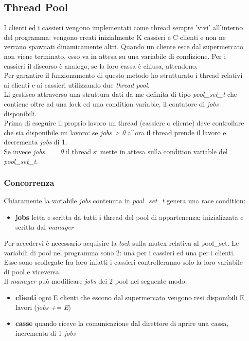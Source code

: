 \documentclass[11pt, a4paper]{article}
\begin{document}
\subsection{Thread Pool}
I clienti ed i cassieri vengono implementati come thread sempre 'vivi' all'interno del programma: vengono creati inizialmente K cassieri e C clienti e non ne verrano spawnati dinamicamente altri. Quando un cliente esce dal supermercato non viene terminato, esso va in attesa su una variabile di condizione. Per i cassieri il discorso è analogo, se la loro cassa è chiusa, attendono.\\
Per garantire il funzionamento di questo metodo ho strutturato i thread relativi ai clienti e ai cassieri utilizzando due \textit{thread pool}. \\Li gestisco attraverso una struttura dati da me definita di tipo \textit{pool\_set\_t} che contiene oltre ad una lock ed una condition variable, il contatore di \textit{jobs} disponibili.\\
Prima di eseguire il proprio lavoro un thread (cassiere o cliente) deve controllare che sia disponibile un lavoro: se \textit{jobs > 0} allora il thread prende il lavoro e decrementa \textit{jobs} di 1. \\ Se invece \textit{jobs == 0} il thread si mette in attesa sulla condition variable del \textit{pool\_set\_t}.
\subsubsection{Concorrenza}
Chiaramente la variabile \textit{jobs} contenuta in \textit{pool\_set\_t} genera una race condition:
\begin{itemize}
\item \textbf{jobs}	letta e scritta da tutti i thread del pool di appartenenza; inizializzata e scritta dal \textit{manager}
\end{itemize} 
Per accedervi è necessario acquisire la \textit{lock} sulla mutex relativa al pool\_set. 
Le variabili di pool nel programma sono 2: una per i cassieri ed una per i clienti. Esse sono scollegate fra loro infatti i cassieri controlleranno solo la loro variabile di pool e viceversa.\\
Il \textit{manager} può modificare \textit{jobs} dei 2 pool nel seguente modo:
\begin{itemize}
\item \textbf{clienti}	ogni E clienti che escono dal supermercato vengono resi disponibili E lavori (\textit{jobs += E})
\item \textbf{casse}	quando riceve la comunicazione dal direttore di aprire una cassa, incrementa di 1 \textit{jobs}
\end{itemize}
\end{document}
